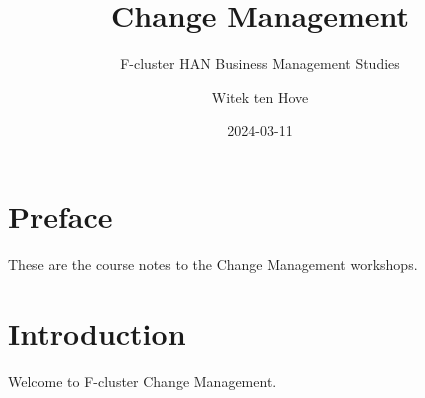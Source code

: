 \documentclass[
  letterpaper,
  DIV=11,
  numbers=noendperiod]{scrreprt}
\title{Change Management}
\subtitle{F-cluster HAN Business Management Studies}
\author{Witek ten Hove}
\date{2024-03-11}
\renewcommand*\contentsname{Table of contents}
\newcommand\contentsname{Table of contents}
\begin{document}
\maketitle

\renewcommand*\contentsname{Table of contents}
{
\hypersetup{linkcolor=}
\setcounter{tocdepth}{2}
\tableofcontents
}

\chapter*{Preface}\label{preface}


These are the course notes to the Change Management workshops.


\chapter{Introduction}\label{introduction}

Welcome to F-cluster Change Management.
\end{document}
